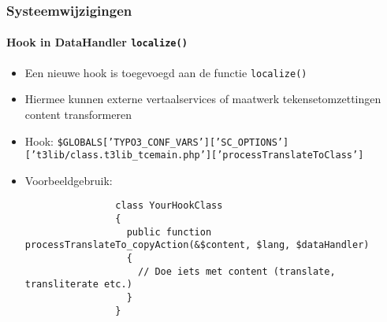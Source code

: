 \begin{frame}[fragile]
	\frametitle{Systeemwijzigingen}
	\framesubtitle{Hook in DataHandler \texttt{localize()}}

	\lstset{basicstyle=\tiny\ttfamily}

	\begin{itemize}
		\item Een nieuwe hook is toegevoegd aan de functie \texttt{localize()}
		\item Hiermee kunnen externe vertaalservices of maatwerk tekensetomzettingen content transformeren
	\end{itemize}

	\begin{itemize}
		\item Hook:\newline
			\smaller
				\texttt{\$GLOBALS['TYPO3\_CONF\_VARS']['SC\_OPTIONS']\newline
				\tabto{0.4cm}['t3lib/class.t3lib\_tcemain.php']['processTranslateToClass']}
			\normalsize

		\item Voorbeeldgebruik:

			\begin{lstlisting}
				class YourHookClass
				{
				  public function processTranslateTo_copyAction(&$content, $lang, $dataHandler)
				  {
				    // Doe iets met content (translate, transliterate etc.)
				  }
				}
			\end{lstlisting}
	\end{itemize}

\end{frame}









